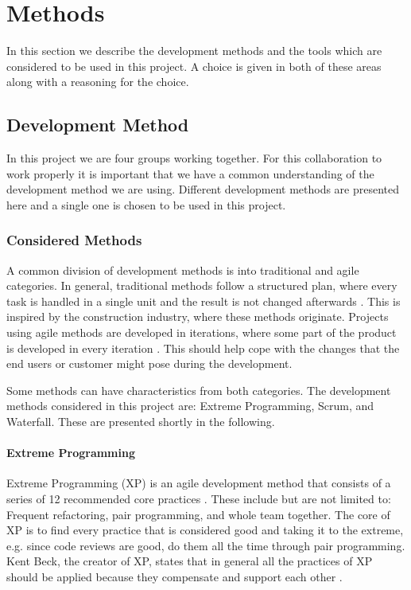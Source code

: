 \section{Methods}
In this section we describe the development methods and the tools which are considered to be used in this project.
A choice is given in both of these areas along with a reasoning for the choice.

\subsection{Development Method}
In this project we are four groups working together.
For this collaboration to work properly it is important that we have a common understanding of the development method we are using.
Different development methods are presented here and a single one is chosen to be used in this project.

\subsubsection{Considered Methods}
A common division of development methods is into traditional and agile categories.
In general, traditional methods follow a structured plan, where every task is handled in a single unit and the result is not changed afterwards \cite[sec.~2.7]{Poppendieck00}.
This is inspired by the construction industry, where these methods originate.
Projects using agile methods are developed in iterations, where some part of the product is developed in every iteration \cite[p.~25]{Larman04}.
This should help cope with the changes that the end users or customer might pose during the development.

Some methods can have characteristics from both categories.
The development methods considered in this project are: Extreme Programming, Scrum, and Waterfall.
These are presented shortly in the following.

\paragraph{Extreme Programming}
Extreme Programming (XP) is an agile development method that consists of a series of 12 recommended core practices \cite[p.~137]{Larman04}.
These include but are not limited to: Frequent refactoring, pair programming, and  whole team together.
The core of XP is to find every practice that is considered good and taking it to the extreme, e.g. since code reviews are good, do them all the time through pair programming.
Kent Beck, the creator of XP, states that in general all the practices of XP should be applied because they compensate and support each other \cite[p.~156-157]{Larman04}.

